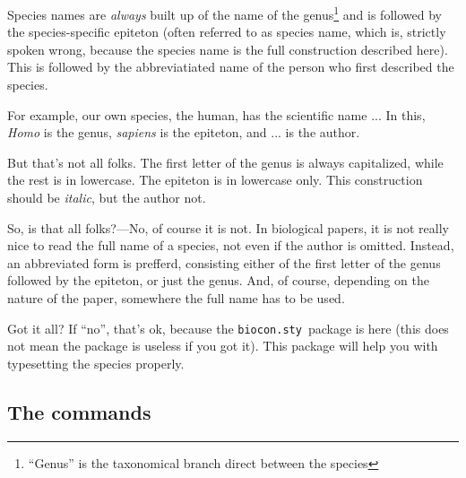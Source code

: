 \documentclass[a4paper]{article}
\newcommand{\biocon}{{\tt biocon.sty}}
\begin{document}
      Species names are \emph{always} built up of the name of the genus\footnote{``Genus'' is the taxonomical branch direct between the species} and is followed by the species-specific epiteton (often referred to as species name, which is, strictly spoken wrong, because the species name is the full construction described here). This is followed by the abbreviatiated name of the person who first described the species.
      
      For example, our own species, the human, has the scientific name  ... In this, \emph{Homo} is the genus, \emph{sapiens} is the epiteton, and ... is the author. 
      
      But that's not all folks. The first letter of the genus is always capitalized, while the rest is in lowercase. The epiteton is in lowercase only. This construction should be {\it italic}, but the author not.
      
      So, is that all folks?---No, of course it is not. In biological papers, it is not really nice to read the full name of a species, not even if the author is omitted. Instead, an abbreviated form is prefferd, consisting either of the first letter of the genus followed by the epiteton, or just the genus. And, of course, depending on the nature of the paper, somewhere the full name has to be used.
      
      Got it all? If ``no'', that's ok, because the \biocon\ package is here (this does not mean the package is useless if you got it). This package will help you with typesetting the species properly.
    \subsection{The commands}\label{secSpeciesCommands}
\end{document}
